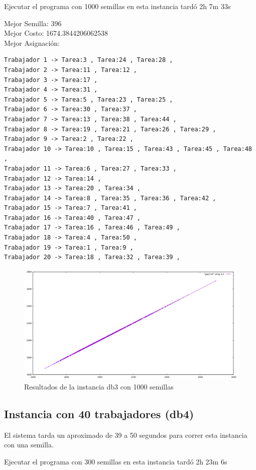 \documentclass{article}
\begin{document}
Ejecutar el programa con 1000 semillas en esta instancia tardó 2h 7m 33s

Mejor Semilla: 396\\
Mejor Costo: 1674.3844206062538\\
Mejor Asignación: 
\begin{lstlisting}
Trabajador 1 -> Tarea:3 , Tarea:24 , Tarea:28 , 
Trabajador 2 -> Tarea:11 , Tarea:12 , 
Trabajador 3 -> Tarea:17 , 
Trabajador 4 -> Tarea:31 , 
Trabajador 5 -> Tarea:5 , Tarea:23 , Tarea:25 , 
Trabajador 6 -> Tarea:30 , Tarea:37 , 
Trabajador 7 -> Tarea:13 , Tarea:38 , Tarea:44 , 
Trabajador 8 -> Tarea:19 , Tarea:21 , Tarea:26 , Tarea:29 , 
Trabajador 9 -> Tarea:2 , Tarea:22 , 
Trabajador 10 -> Tarea:10 , Tarea:15 , Tarea:43 , Tarea:45 , Tarea:48 , 
Trabajador 11 -> Tarea:6 , Tarea:27 , Tarea:33 , 
Trabajador 12 -> Tarea:14 , 
Trabajador 13 -> Tarea:20 , Tarea:34 , 
Trabajador 14 -> Tarea:8 , Tarea:35 , Tarea:36 , Tarea:42 , 
Trabajador 15 -> Tarea:7 , Tarea:41 , 
Trabajador 16 -> Tarea:40 , Tarea:47 , 
Trabajador 17 -> Tarea:16 , Tarea:46 , Tarea:49 , 
Trabajador 18 -> Tarea:4 , Tarea:50 , 
Trabajador 19 -> Tarea:1 , Tarea:9 , 
Trabajador 20 -> Tarea:18 , Tarea:32 , Tarea:39 , 
\end{lstlisting}

\begin{figure}[H]
	\centering
	\includegraphics[scale=0.5]{imgs/gap3.png}
	\caption{Resultados de la instancia db3 con 1000 semillas}
\end{figure}


\subsection{Instancia con 40 trabajadores (db4)}
El sistema tarda un aproximado de 39 a 50 segundos para correr esta instancia con una semilla.

Ejecutar el programa con 300 semillas en esta instancia tardó 2h 23m 6s
 
\end{document}
